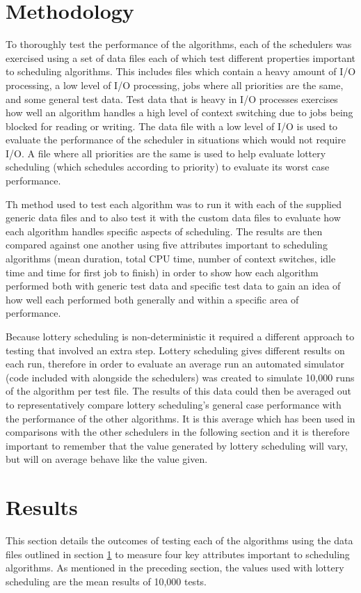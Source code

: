 \documentclass{acm_proc_article-sp}
\begin{document}
\section{Methodology} 
\label{methodology}
To thoroughly test the performance of the algorithms, each of the schedulers was exercised using a set of data files each of which test different properties important to scheduling algorithms. This includes files which contain a heavy amount of I/O processing, a low level of I/O processing, jobs where all priorities are the same, and some general test data. Test data that is heavy in I/O processes exercises how well an algorithm handles a high level of context switching due to jobs being blocked for reading or writing. The data file with a low level of I/O is used to evaluate the performance of the scheduler in situations which would not require I/O. A file where all priorities are the same is used to help evaluate lottery scheduling (which schedules according to priority) to evaluate its worst case performance.

Th method used to test each algorithm was to run it with each of the supplied generic data files and to also test it with the custom data files to evaluate how each algorithm handles specific aspects of scheduling. The results are then compared against one another using five attributes important to scheduling algorithms (mean duration, total CPU time, number of context switches, idle time and time for first job to finish) in order to show how each algorithm performed both with generic test data and specific test data to gain an idea of how well each performed both generally and within a specific area of performance.

Because lottery scheduling is non-deterministic it required a different approach to testing that involved an extra step. Lottery scheduling gives different results on each run, therefore in order to evaluate an average run an automated simulator (code included with alongside the schedulers) was created to simulate 10,000 runs of the algorithm per test file. The results of this data could then be averaged out to representatively compare lottery scheduling's general case performance with the performance of the other algorithms. It is this average which has been used in comparisons with the other schedulers in the following section and it is therefore important to remember that the value generated by lottery scheduling will vary, but will on average behave like the value given.

\section{Results}
\label{results}
This section details the outcomes of testing each of the algorithms using the data files outlined in section \ref{methodology} to measure four key attributes important to scheduling algorithms. As mentioned in the preceding section, the values used with lottery scheduling are the mean results of 10,000 tests.
\end{document}
